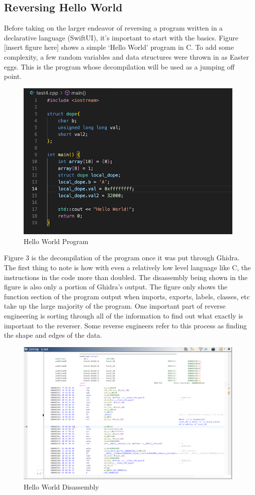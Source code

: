 \subsection{Reversing Hello World}
Before taking on the larger endeavor of reversing a program written in a declarative language (SwiftUI), it’s important to start with the basics. 
Figure [insert figure here] shows a simple ‘Hello World’ program in C. 
To add some complexity, a few random variables and data structures were thrown in as Easter eggs. 
This is the program whose decompilation will be used as a jumping off point.
\begin{figure}[h]
\caption{Hello World Program}
\includegraphics[scale=.75]{HelloWorldSource.png}
\end{figure}
Figure 3 is the decompilation of the program once it was put through Ghidra. 
The first thing to note is how with even a relatively low level language like C, the instructions in the code more than doubled. 
The disassembly being shown in the figure is also only a portion of Ghidra’s output. 
The figure only shows the function section of the program output when imports, exports, labels, classes, etc take up the large majority of the program. 
One important part of reverse engineering is sorting through all of the information to find out what exactly is important to the reverser. 
Some reverse engineers refer to this process as finding the shape and edges of the data. 
\begin{figure}[h]
\caption{Hello World Disassembly}
\includegraphics{HelloWorldGhidra.png}
\end{figure}
